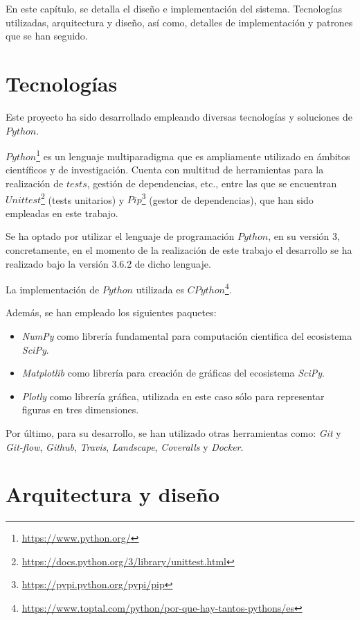 En este capítulo, se detalla el diseño e implementación del sistema. Tecnologías utilizadas, arquitectura
y diseño, así como, detalles de implementación y patrones que se han seguido.

\section{Tecnologías}

Este proyecto ha sido desarrollado empleando diversas tecnologías y soluciones de $Python$.

$Python$\footnote{\url{https://www.python.org/}} es un lenguaje multiparadigma que es ampliamente utilizado en ámbitos científicos y de investigación.
Cuenta con multitud de herramientas para la realización de $tests$, gestión de dependencias, etc., entre las
que se encuentran $Unittest$\footnote{\url{https://docs.python.org/3/library/unittest.html}} (tests unitarios) y $Pip$\footnote{\url{https://pypi.python.org/pypi/pip}} (gestor de dependencias), que han sido empleadas en este trabajo.

Se ha optado por utilizar el lenguaje de programación $Python$, en su versión 3, concretamente, en el momento de la realización de este trabajo el desarrollo se ha realizado
bajo la versión 3.6.2 de dicho lenguaje.

La implementación de $Python$ utilizada es $CPython$\footnote{\url{https://www.toptal.com/python/por-que-hay-tantos-pythons/es}}.

Además, se han empleado los siguientes paquetes:

\begin{itemize}
  \item \textit{NumPy} como librería fundamental para computación cientifica del ecosistema \textit{SciPy}.
  \item \textit{Matplotlib} como librería para creación de gráficas del ecosistema \textit{SciPy}.
  \item \textit{Plotly} como librería gráfica, utilizada en este caso sólo para representar figuras en tres dimensiones.
\end{itemize}

Por último, para su desarrollo, se han utilizado otras herramientas como: \textit{Git} y \textit{Git-flow}, \textit{Github},
\textit{Travis}, \textit{Landscape}, \textit{Coveralls} y \textit{Docker}.

\section{Arquitectura y diseño}

